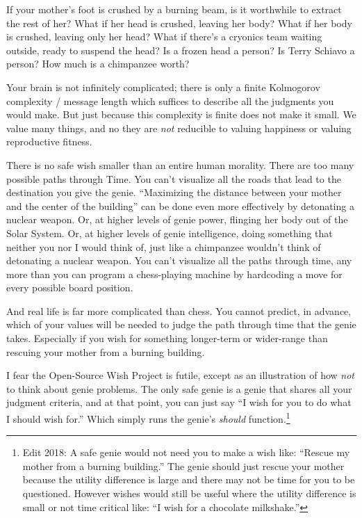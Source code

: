 {{
 If your mother's foot is crushed by a burning
beam, is it worthwhile to extract the rest of her? What if her head is
crushed, leaving her body? What if her body is crushed, leaving only
her head? What if there's a cryonics team waiting
outside, ready to suspend the head? Is a frozen head a person? Is Terry
Schiavo a person? How much is a chimpanzee worth?}

{
 Your brain is not infinitely complicated; there is only a finite
Kolmogorov complexity / message length which suffices to describe all
the judgments you would make. But just because this complexity is
finite does not make it small. We value many things, and no they are
\textit{not} reducible to valuing happiness or valuing reproductive
fitness.}

{
 There is no safe wish smaller than an entire human morality. There
are too many possible paths through Time. You can't
visualize all the roads that lead to the destination you give the
genie. ``Maximizing the distance between your mother
and the center of the building'' can be done even
more effectively by detonating a nuclear weapon. Or, at higher levels
of genie power, flinging her body out of the Solar System. Or, at
higher levels of genie intelligence, doing something that neither you
nor I would think of, just like a chimpanzee wouldn't
think of detonating a nuclear weapon. You can't
visualize all the paths through time, any more than you can program a
chess-playing machine by hardcoding a move for every possible board
position.}

{
 And real life is far more complicated than chess. You cannot
predict, in advance, which of your values will be needed to judge the
path through time that the genie takes. Especially if you wish for
something longer-term or wider-range than rescuing your mother from a
burning building.}

{
 I fear the Open-Source Wish Project is futile, except as an
illustration of how \textit{not} to think about genie problems. The
only safe genie is a genie that shares all your judgment criteria, and
at that point, you can just say ``I wish for you to do
what I should wish for.'' Which simply runs the
genie's \textit{should} function.\footnote{Edit 2018: A safe genie would not need you to make a wish like: ``Rescue my mother from a burning building.'' The genie should just rescue your mother because the utility difference is large and there may not be time for you to be questioned. However wishes would still be useful where the utility difference is small or not time critical like: ``I wish for a chocolate milkshake.''}

}}
